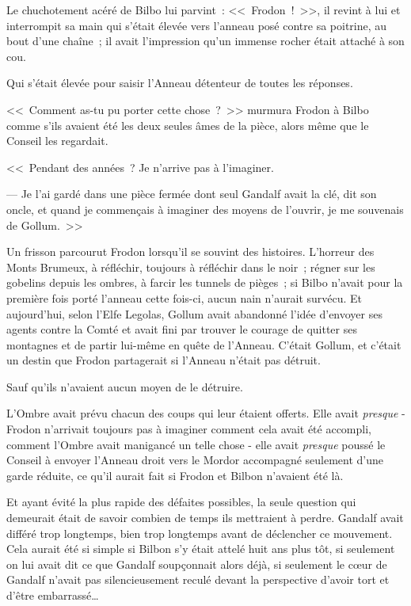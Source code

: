 Le chuchotement acéré de Bilbo lui parvint~: <<~Frodon~!~>>, il revint à lui et interrompit sa main qui s'était élevée vers l'anneau posé contre sa poitrine, au bout d'une chaîne~; il avait l'impression qu'un immense rocher était attaché à son cou.

Qui s'était élevée pour saisir l'Anneau détenteur de toutes les réponses.

<<~Comment as-tu pu porter cette chose~?~>> murmura Frodon à Bilbo comme s'ils avaient été les deux seules âmes de la pièce, alors même que le Conseil les regardait.

<<~Pendant des années~? Je n'arrive pas à l'imaginer.

--- Je l'ai gardé dans une pièce fermée dont seul Gandalf avait la clé, dit son oncle, et quand je commençais à imaginer des moyens de l'ouvrir, je me souvenais de Gollum.~>>

Un frisson parcourut Frodon lorsqu'il se souvint des histoires. L'horreur des Monts Brumeux, à réfléchir, toujours à réfléchir dans le noir~; régner sur les gobelins depuis les ombres, à farcir les tunnels de pièges~; si Bilbo n'avait pour la première fois porté l'anneau cette fois-ci, aucun nain n'aurait survécu. Et aujourd'hui, selon l'Elfe Legolas, Gollum avait abandonné l'idée d'envoyer ses agents contre la Comté et avait fini par trouver le courage de quitter ses montagnes et de partir lui-même en quête de l'Anneau. C'était Gollum, et c'était un destin que Frodon partagerait si l'Anneau n'était pas détruit.

Sauf qu'ils n'avaient aucun moyen de le détruire.

L'Ombre avait prévu chacun des coups qui leur étaient offerts. Elle avait \emph{presque} - Frodon n'arrivait toujours pas à imaginer comment cela avait été accompli, comment l'Ombre avait manigancé un telle chose - elle avait \emph{presque} poussé le Conseil à envoyer l'Anneau droit vers le Mordor accompagné seulement d'une garde réduite, ce qu'il aurait fait si Frodon et Bilbon n'avaient été là.

Et ayant évité la plus rapide des défaites possibles, la seule question qui demeurait était de savoir combien de temps ils mettraient à perdre. Gandalf avait différé trop longtemps, bien trop longtemps avant de déclencher ce mouvement. Cela aurait été si simple si Bilbon s'y était attelé huit ans plus tôt, si seulement on lui avait dit ce que Gandalf soupçonnait alors déjà, si seulement le cœur de Gandalf n'avait pas silencieusement reculé devant la perspective d'avoir tort et d'être embarrassé…

